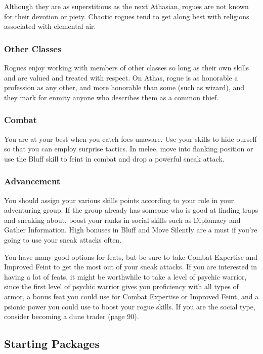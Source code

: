 Although they are as superstitious as the next Athasian, rogues are not known for their devotion or piety. Chaotic rogues tend to get along best with religions associated with elemental air.

\subsubsection{Other Classes}

Rogues enjoy working with members of other classes so long as their own skills and are valued and treated with respect. On Athas, rogue is as honorable a profession as any other, and more honorable than some (such as
wizard), and they mark for enmity anyone who describes them as a common thief.

\subsubsection{Combat}

You are at your best when you catch foes unaware. Use your skills to hide ourself so that you can employ surprise tactics. In melee, move into flanking position or use the Bluff skill to feint in combat and drop a powerful sneak attack.

\subsubsection{Advancement}

You should assign your various skills points according to your role in your adventuring group. If the group already has someone who is good at finding traps and sneaking about, boost your ranks in social skills such as Diplomacy and Gather Information. High bonuses in Bluff and Move Silently are a must if you’re going to use your sneak attacks often.

You have many good options for feats, but be sure to take Combat Expertise and Improved Feint to get the most out of your sneak attacks. If you are interested in having a lot of feats, it might be worthwhile to take a level of psychic warrior, since the first level of psychic warrior gives you proficiency with all types of armor, a bonus feat you could use for Combat Expertise or Improved Feint, and a psionic power you could use to boost your rogue skills. If you are the social type, consider becoming a dune trader (page 90).

\subsection{Starting Packages}
